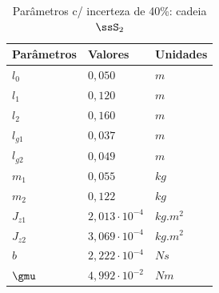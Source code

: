 \documentclass[]{politex}
\begin{document}
\begin{multicols}{2}
\begin{table}[H] 
\centering
\caption{Parâmetros c/ incerteza de 40\%: cadeia $\ssS_2$}
\label{tab:parametrosSimulacao6}
\begin{tabular}{l|l|l}
Parâmetros   & Valores                    & Unidades   \\ \hline
$l_0$        & $0{,}050$                    & $m$        \\
$l_1$        & $0{,}120$                    & $m$        \\
$l_2$        & $0{,}160$                    & $m$        \\
$l_{g1}$     & $0{,}037$                    & $m$        \\
$l_{g2}$     & $0{,}049$                    & $m$        \\
$m_1$        & $0{,}055$                    & $kg$       \\
$m_2$        & $0{,}122$                    & $kg$       \\
$J_{z1}$     & $2{,}013   \cdot 10^{-4}$    & $kg.m^{2}$ \\
$J_{z2}$     & $3{,}069   \cdot 10^{-4}$    & $kg.m^{2}$ \\
$b$          & $2{,}222 \cdot 10^{-4}$      & $N s$      \\
$\gmu$       & $4{,}992 \cdot 10^{-2}$      & $Nm$        \\
\end{tabular}
\end{table}
\end{multicols}

\end{document}
